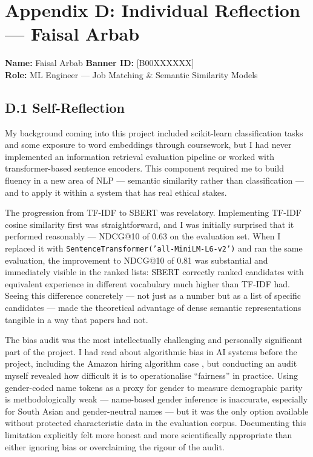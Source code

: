\chapter*{Appendix D: Individual Reflection --- Faisal Arbab}
\textbf{Name:} Faisal Arbab \hfill \textbf{Banner ID:} [B00XXXXXX] \\[4pt]
\textbf{Role:} ML Engineer --- Job Matching \& Semantic Similarity Models
\vspace{1em}

\section*{D.1 Self-Reflection}

My background coming into this project included scikit-learn classification tasks and some exposure to word embeddings through coursework, but I had never implemented an information retrieval evaluation pipeline or worked with transformer-based sentence encoders. This component required me to build fluency in a new area of NLP --- semantic similarity rather than classification --- and to apply it within a system that has real ethical stakes.

The progression from TF-IDF to SBERT was revelatory. Implementing TF-IDF cosine similarity first was straightforward, and I was initially surprised that it performed reasonably --- NDCG@10 of 0.63 on the evaluation set. When I replaced it with \texttt{SentenceTransformer('all-MiniLM-L6-v2')} and ran the same evaluation, the improvement to NDCG@10 of 0.81 was substantial and immediately visible in the ranked lists: SBERT correctly ranked candidates with equivalent experience in different vocabulary much higher than TF-IDF had. Seeing this difference concretely --- not just as a number but as a list of specific candidates --- made the theoretical advantage of dense semantic representations tangible in a way that papers had not.

The bias audit was the most intellectually challenging and personally significant part of the project. I had read about algorithmic bias in AI systems before the project, including the Amazon hiring algorithm case \citep{Dastin2018}, but conducting an audit myself revealed how difficult it is to operationalise ``fairness'' in practice. Using gender-coded name tokens as a proxy for gender to measure demographic parity is methodologically weak --- name-based gender inference is inaccurate, especially for South Asian and gender-neutral names --- but it was the only option available without protected characteristic data in the evaluation corpus. Documenting this limitation explicitly felt more honest and more scientifically appropriate than either ignoring bias or overclaiming the rigour of the audit.

